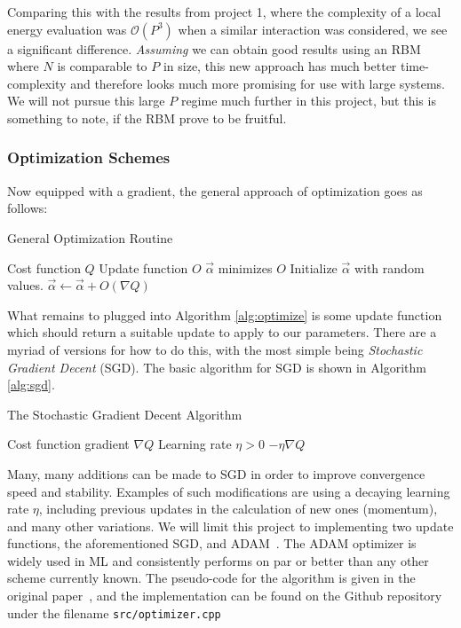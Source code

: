\documentclass[a4paper, 11pt]{article}
\begin{document}
\begin{multicols}{2}
    Comparing this with the results from project 1, where the complexity of a
    local energy evaluation was $\mathcal{O}(P^3)$ when a similar interaction
    was considered, we see a significant
    difference. \emph{Assuming} we can obtain good results using an RBM where $N$ is
    comparable to $P$ in size, this new approach has much better time-complexity
    and therefore looks much more promising for use with large systems. We will
    not pursue this large $P$ regime much further in this project, but this is
    something to note, if the RBM prove to be fruitful.

    \subsubsection{Optimization Schemes}

    Now equipped with a gradient, the general approach of optimization goes as
    follows:
\begin{algorithm}[H]
    \caption{General Optimization Routine}
    \label{alg:optimize}
    \begin{algorithmic}
        \REQUIRE Cost function $Q$
        \REQUIRE Update function $O$
        \ENSURE $\vec \alpha$ minimizes $O$
        \STATE Initialize $\vec\alpha$ with random values.
        \STATE $\vec\alpha \leftarrow \vec\alpha + O(\nabla Q)$
        \ENDWHILE
    \end{algorithmic}
\end{algorithm}

    What remains to plugged into Algorithm \ref{alg:optimize} is some update function
    which should return a suitable update to apply to our parameters. There are
    a myriad of versions for how to do this, with the most simple being
    \emph{Stochastic Gradient Decent} (SGD). The basic algorithm for SGD is
    shown in Algorithm \ref{alg:sgd}.

\begin{algorithm}[H]
    \caption{The Stochastic Gradient Decent Algorithm}
    \label{alg:sgd}
    \begin{algorithmic}
        \REQUIRE Cost function gradient $\nabla Q$
        \REQUIRE Learning rate $\eta > 0$
        \RETURN $-\eta \nabla Q$
    \end{algorithmic}
\end{algorithm}


    Many, many additions can be made to SGD in order to improve convergence
    speed and stability. Examples of such modifications are using a decaying
    learning rate $\eta$, including previous updates in the calculation of new
    ones (momentum), and many other variations. We will limit this project to
    implementing two update functions, the aforementioned SGD, and
    ADAM~\cite{KingmaB14}. The ADAM optimizer is widely used in ML and
    consistently performs on par or better than any other scheme currently
    known. The pseudo-code for the algorithm is given in the original
    paper~\cite{KingmaB14}, and the implementation can be found on the Github
    repository under the filename \texttt{src/optimizer.cpp}



\end{multicols}
\end{document}
